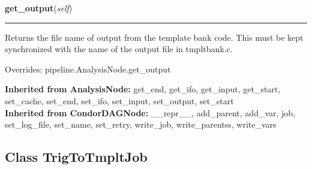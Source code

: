     \label{inspiral:TmpltBankNode:get_output}
    \vspace{0.5ex}

    \noindent\begin{boxedminipage}{\textwidth}

    \raggedright \textbf{get\_output}(\textit{self})

    \vspace{-1.5ex}

    \rule{\textwidth}{0.5\fboxrule}
    Returns the file name of output from the template bank code. This 
    must be kept synchronized with the name of the output file in 
    tmpltbank.c.

    \vspace{1ex}

      Overrides: pipeline.AnalysisNode.get\_output

    \end{boxedminipage}

  \textbf{Inherited from AnalysisNode:}
    get\_end,
    get\_ifo,
    get\_input,
    get\_start,
    set\_cache,
    set\_end,
    set\_ifo,
    set\_input,
    set\_output,
    set\_start
    \\
  \textbf{Inherited from CondorDAGNode:}
    \_\_repr\_\_,
    add\_parent,
    add\_var,
    job,
    set\_log\_file,
    set\_name,
    set\_retry,
    write\_job,
    write\_parentss,
    write\_vars


\subsection{Class TrigToTmpltJob}

